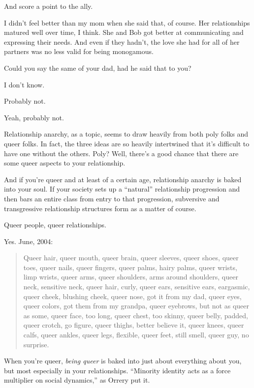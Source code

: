 \begin{leftcolumn}
\begin{ally}
And score a point to the ally.
\end{ally}
I didn't feel better than my mom when she said that, of course. Her relationships matured well over time, I think. She and Bob got better at communicating and expressing their needs. And even if they hadn't, the love she had for all of her partners was no less valid for being monogamous.

\begin{ally}
Could you say the same of your dad, had he said that to you?
\end{ally}
I don't know.

\begin{ally}
Probably not.
\end{ally}
Yeah, probably not.
\newpage

\noindent Relationship anarchy, as a topic, seems to draw heavily from both poly folks and queer folks. In fact, the three ideas are so heavily intertwined that it's difficult to have one without the others. Poly? Well, there's a good chance that there are some queer aspects to your relationship.

And if you're queer and at least of a certain age, relationship anarchy is baked into your soul. If your society sets up a ``natural'' relationship progression and then bars an entire class from entry to that progression, subversive and transgressive relationship structures form as a matter of course.

\begin{ally}
Queer people, queer relationships.
\end{ally}
Yes. June, 2004:

\begin{quotation}
Queer hair, queer mouth, queer brain, queer sleeves, queer shoes, queer toes, queer nails, queer fingers, queer palms, hairy palms, queer wrists, limp wrists, queer arms, queer shoulders, arms around shoulders, queer neck, sensitive neck, queer hair, curly, queer ears, sensitive ears, eargasmic, queer cheek, blushing cheek, queer nose, got it from my dad, queer eyes, queer colors, got them from my grandpa, queer eyebrows, but not as queer as some, queer face, too long, queer chest, too skinny, queer belly, padded, queer crotch, go figure, queer thighs, better believe it, queer knees, queer calfs, queer ankles, queer legs, flexible, queer feet, still smell, queer guy, no surprise.
\end{quotation}

When you're queer, \emph{being queer} is baked into just about everything about you, but most especially in your relationships. ``Minority identity acts as a force multiplier on social dynamics,'' as Orrery put it.


\end{leftcolumn}
